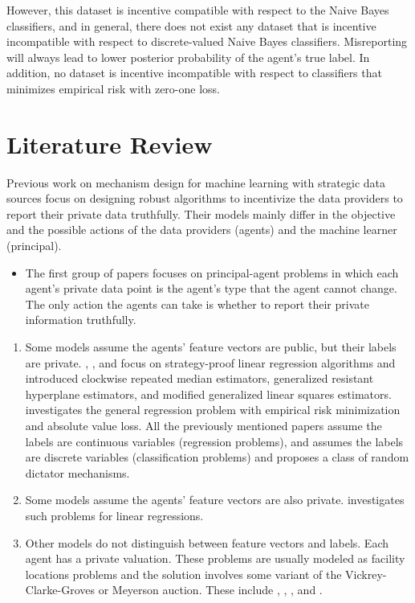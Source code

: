 \documentclass{article}
\begin{document}
\newline \newline
However, this dataset is incentive compatible with respect to the Naive Bayes classifiers, and in general, there does not exist any dataset that is incentive incompatible with respect to discrete-valued Naive Bayes classifiers. Misreporting will always lead to lower posterior probability of the agent's true label. In addition, no dataset is incentive incompatible with respect to classifiers that minimizes empirical risk with zero-one loss.
\newline \newline



\section{Literature Review} 
Previous work on mechanism design for machine learning with strategic data sources focus on designing robust algorithms to incentivize the data providers to report their private data truthfully. Their models mainly differ in the objective and the possible actions of the data providers (agents) and the machine learner (principal).
\begin{itemize}
\item The first group of papers focuses on principal-agent problems in which each agent's private data point is the agent's type that the agent cannot change. The only action the agents can take is whether to report their private information truthfully.
\end{itemize}
\begin{enumerate}
\item Some models assume the agents' feature vectors are public, but their labels are private. \citet*{perote2004strategy}, \citet*{chen2018strategyproof}, and \citet*{gast2013linear} focus on strategy-proof linear regression algorithms and introduced clockwise repeated median estimators, generalized resistant hyperplane estimators, and modified generalized linear squares estimators. \citet*{dekel2010incentive} investigates the general regression problem with empirical risk minimization and absolute value loss. All the previously mentioned papers assume the labels are continuous variables (regression problems), and \citet*{meir2012algorithms} assumes the labels are discrete variables (classification problems) and proposes a class of random dictator mechanisms.
\item Some models assume the agents' feature vectors are also private. \citet*{chen2019grinding} investigates such problems for linear regressions.
\item Other models do not distinguish between feature vectors and labels. Each agent has a private valuation. These problems are usually modeled as facility locations problems and the solution involves some variant of the Vickrey-Clarke-Groves or Meyerson auction. These include \citet*{dutting2017optimal}, \citet*{golowich2018deep}, \citet*{epasto2018incentive}, and \citet*{procaccia2009approximate}.
\end{enumerate}
\end{document}
